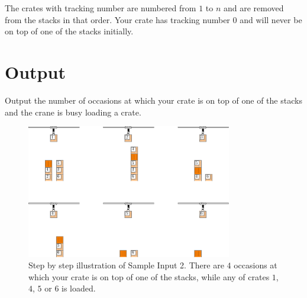 The crates with tracking number are numbered from $1$ to $n$ and are removed
from the stacks in that order. Your crate has tracking number $0$ and will never
be on top of one of the stacks initially.

\section*{Output}
Output the number of occasions at which your crate is on top of one of the stacks and the
crane is busy loading a crate.

\begin{figure}[h!]
  \centering
  \includegraphics[width=0.8\textwidth]{harbour2/problem_statement/demo}
    \caption{Step by step illustration of Sample Input 2. There are $4$
    occasions at which your crate is on top of one of the stacks, while any of
    crates $1$, $4$, $5$ or $6$ is loaded.}
\end{figure}
